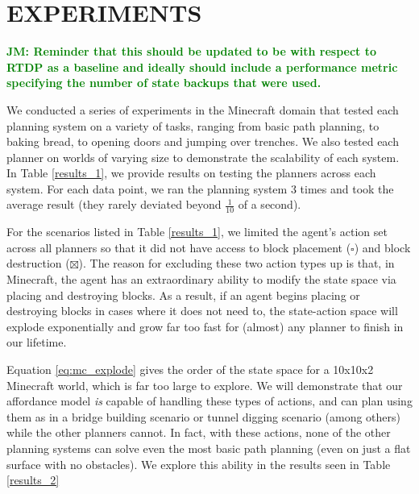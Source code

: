 \documentclass[]{article}
\newcommand{\stnote}[1]{\textcolor{Blue}{\textbf{ST: #1}}}
\newcommand{\jmnote}[1]{\textcolor{Green}{\textbf{JM: #1}}}
\begin{document}

\section{EXPERIMENTS}

\jmnote{Reminder that this should be updated to be with respect to RTDP as a baseline
and ideally should include a performance metric specifying the number of
state backups that were used.}


We conducted a series of experiments in the Minecraft domain that
tested each planning system on a variety of tasks, ranging from basic
path planning, to baking bread, to opening doors and jumping over
trenches.  We also tested each planner on worlds of varying size to
demonstrate the scalability of each system. In Table \ref{results_1},
we provide results on testing the planners across each system. For
each data point, we ran the planning system 3 times and took the
average result (they rarely deviated beyond $\frac{1}{10}$ of a
second).

For the scenarios listed in Table \ref{results_1}, we limited the agent's 
action set across all planners so that it did not have access to block 
placement ($\square$) and block destruction ($\boxtimes$). The reason 
for excluding these two action types up is that, in Minecraft, the agent 
has an extraordinary ability to modify the state space via placing and 
destroying blocks. As a result, if an agent begins placing or destroying 
blocks in cases where it does not need to, the state-action space will 
explode exponentially and grow far too fast for (almost) any planner to 
finish in our lifetime. 


Equation \ref{eq:mc_explode} gives the order of the state space for a 
10x10x2 Minecraft world,
which is far too large to explore. We will demonstrate that our 
affordance model {\it is} capable of handling these types of actions, 
and can plan using them as in a bridge building scenario or tunnel 
digging scenario (among others) while the other planners cannot. 
In fact, with these actions, none of the other planning systems 
can solve even the most basic path planning (even on just a flat 
surface with no obstacles). We explore this ability in the results 
seen in Table \ref{results_2}
\end{document}
